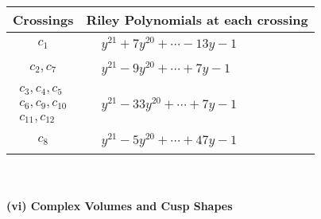 \documentclass[1p]{elsarticle_modified}
\theoremstyle{definition}
\begin{document}
\begin{tabular}{m{50pt}|m{274pt}}
Crossings & \hspace{64pt}Riley Polynomials at each crossing \\
\hline $$\begin{aligned}c_{1}\end{aligned}$$&$\begin{aligned}
&y^{21}+7 y^{20}+\cdots-13 y-1
\end{aligned}$\\
\hline $$\begin{aligned}c_{2},c_{7}\end{aligned}$$&$\begin{aligned}
&y^{21}-9 y^{20}+\cdots+7 y-1
\end{aligned}$\\
\hline $$\begin{aligned}c_{3},c_{4},c_{5}\\c_{6},c_{9},c_{10}\\c_{11},c_{12}\end{aligned}$$&$\begin{aligned}
&y^{21}-33 y^{20}+\cdots+7 y-1
\end{aligned}$\\
\hline $$\begin{aligned}c_{8}\end{aligned}$$&$\begin{aligned}
&y^{21}-5 y^{20}+\cdots+47 y-1
\end{aligned}$\\
\hline
\end{tabular}\\~\\
\newpage\flushleft \textbf{(vi) Complex Volumes and Cusp Shapes}
\end{document}
